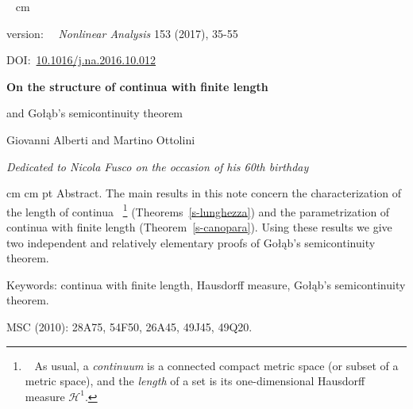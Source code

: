 \documentclass[11pt,reqno,a4paper,final]{amsart}
\numberwithin{equation}{section}
\theoremstyle{mytheorem}
\theoremstyle{myremark}
\theoremstyle{myparagraph}
\newcommand{\Haus}{\mathscr{H}}
\newcommand{\Golab}{Go{\l}\k{a}b}
\begin{document}


\thispagestyle{empty}
~ cm


{\footnotesize\noindent 
version:~\dataversione%
%
\,\raisebox{4pt}{$\dagger$}%
\let\thefootnote\relax{}%
%
\hfill 
\emph{Nonlinear Analysis} 153 (2017), 35-55\par
\hfill DOI:~\href{http://dx.doi.org/10.1016/j.na.2016.10.012}%
{10.1016/j.na.2016.10.012} \par
}

\vspace{1.5 cm}


{\centering\Large\bf
On the structure of continua with finite length\par
\smallskip
and \Golab's semicontinuity theorem
\par
}

\vspace{.6 cm}


\centerline{\sc Giovanni Alberti and Martino Ottolini}

\vspace{.6 cm}


{\centering\small\sl 
Dedicated to Nicola Fusco on the occasion of his 60th birthday\\
}

\vspace{.8 cm}


{ cm
 cm
 pt
\footnotesize
{\sc Abstract.}
The main results in this note concern the characterization of the length 
of continua%
%
\,\raisebox{3pt}{\tiny1}\let\thefootnote\relax%
\footnote{\raisebox{3pt}{\scriptsize1}~
As usual, a \emph{continuum} is a connected compact metric 
space (or subset of a metric space), and the \emph{length} of a set 
is its one-dimensional Hausdorff measure $\Haus^1$.}  
%
(Theorems~\ref{s-lunghezza})
and the parametrization of continua with finite length (Theorem~\ref{s-canopara}).
Using these results we give two independent and relatively elementary proofs 
of \Golab's semicontinuity theorem.
\par
\medskip\noindent
{\sc Keywords:} 
continua with finite length, 
Hausdorff measure, 
\Golab's semicontinuity theorem.
\par
\medskip\noindent
{\sc MSC (2010):} 
28A75, 54F50, 26A45, 49J45, 49Q20.
\par
}
\end{document}

